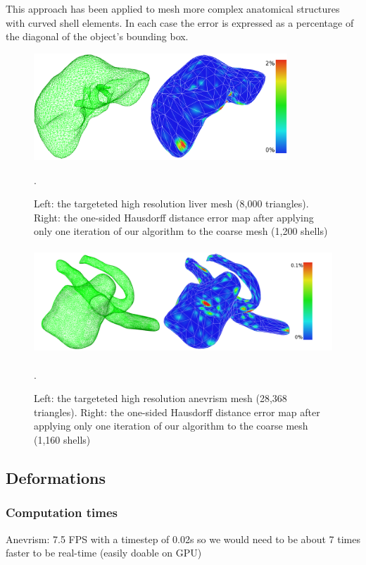 \documentclass{llncs}
\begin{document}
This approach has been applied to mesh more complex anatomical structures with curved shell elements. In each case the error is expressed as a percentage of the diagonal of the object's bounding box. 

\begin{figure}
\centering
\includegraphics[height=4cm]{images/resultsLiver}
\caption {Left: the targeteted high resolution liver mesh (8,000 triangles). Right: the one-sided Hausdorff distance error map after applying only one iteration of our algorithm to the coarse mesh (1,200 shells)}. 
\label{fig-liver}
\end{figure}

\begin{figure}
\centering
\includegraphics[height=4cm]{images/resultsAnevrism}
\caption {Left: the targeteted high resolution anevrism mesh (28,368 triangles). Right: the one-sided Hausdorff distance error map after applying only one iteration of our algorithm to the coarse mesh (1,160 shells)}.
\label{fig-anevrism}
\end{figure}



\subsection{Deformations}

\subsubsection{Computation times}

Anevrism: 7.5 FPS with a timestep of 0.02s so we would need to be about 7 times faster to be real-time (easily doable on GPU)
\end{document}
